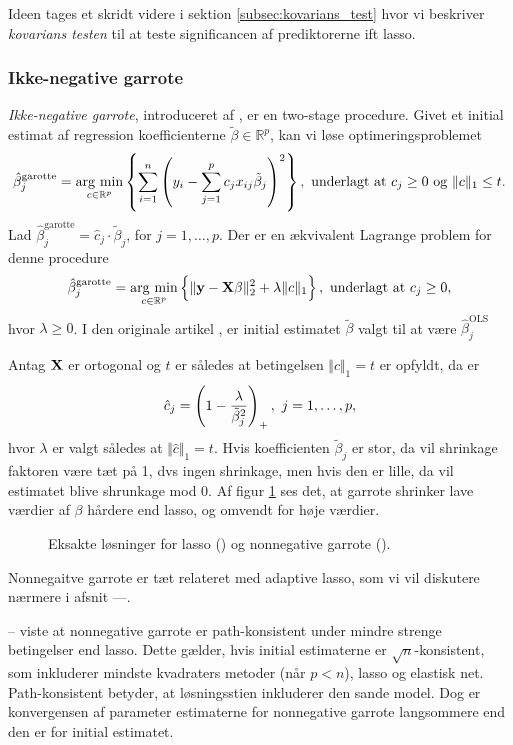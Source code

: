 Ideen tages et skridt videre i sektion \ref{subsec:kovarians_test} hvor vi beskriver \textit{kovarians testen} til at teste significancen af prediktorerne ift lasso.


\subsubsection{Ikke-negative garrote}
\textit{Ikke-negative garrote}, introduceret af \citep{nonnegative_garrote}, er en two-stage procedure. 
Givet et initial estimat af regression koefficienterne \(\tilde{\beta} \in \mathbb{R}^p\), kan vi løse optimeringsproblemet
\begin{align}
\hat{\beta}_j^\text{garotte} = \argmin_{c \in \mathbb{R}^p}  \cbr{ \sum_{i=1}^n \del{y_i - \sum_{j=1}^p c_j x_{ij} \tilde{\beta}_j}^2}, \ \text{underlagt at } c_j \geq 0 \text{ og } \Vert c \Vert_1 \leq t. \label{eq:2.19}
\end{align}
Lad \(\hat{\beta}_j^\text{garotte} = \hat{c}_j \cdot \tilde{\beta}_j\), for \(j = 1, \ldots, p\).
Der er en ækvivalent Lagrange problem for denne procedure
\begin{align*}
\hat{\beta}_j^\text{garotte} = \argmin_{c \in \mathbb{R}^p}  \cbr{\Vert \y - \X \beta \Vert_2^2 + \lambda \Vert c \Vert_1}, \ \text{underlagt at } c_j \geq 0,
\end{align*}
hvor \(\lambda \geq 0\).
I den originale artikel \citep{nonnegative_garrote}, er initial estimatet \(\tilde{\beta}\) valgt til at være \(\hat{\beta}_j^\text{OLS}\)

Antag \(\mathbf{X}\) er ortogonal og \(t\) er således at betingelsen \(\Vert c \Vert_1 = t\) er opfyldt, da er
\begin{align*}
\hat{c}_j = \del{1 - \frac{\lambda}{\tilde{\beta}_j^2}}_+, \ j = 1, \ldots, p,
\end{align*}
hvor \(\lambda\) er valgt således at \(\Vert \hat{c} \Vert_1 = t\).
Hvis koefficienten \(\tilde{\beta}_j\) er stor, da vil shrinkage faktoren være tæt på 1, dvs ingen shrinkage, men hvis den er lille, da vil estimatet blive shrunkage mod 0.
Af figur \ref{fig:nonnegative_garrote} ses det, at garrote shrinker lave værdier af \(\beta\) hårdere end lasso, og omvendt for høje værdier.
%
\begin{figure}[H]
\centering
\scalebox{0.8}{}
\caption[optional short text]{Eksakte løsninger for lasso () og nonnegative garrote ().} \label{fig:nonnegative_garrote}
\end{figure}
%
Nonnegaitve garrote er tæt relateret med adaptive lasso, som vi vil diskutere nærmere i afsnit ---.

-- viste at nonnegative garrote er path-konsistent under mindre strenge betingelser end lasso.
Dette gælder, hvis initial estimaterne er \(\sqrt{n}\)-konsistent, som inkluderer mindste kvadraters metoder (når \(p < n\)), lasso og elastisk net.
Path-konsistent betyder, at løsningsstien inkluderer den sande model.
Dog er konvergensen af parameter estimaterne for nonnegative garrote langsommere end den er for initial estimatet.
 